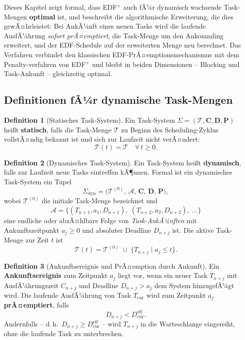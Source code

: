 ﻿\documentclass[a4paper,12pt]{article}
\theoremstyle{definition}
\newtheorem{definition}{Definition}
\begin{document}
	Dieses Kapitel zeigt formal, dass EDF$^+$ auch fÃ¼r dynamisch wachsende Task-Mengen
	\textbf{optimal} ist, und beschreibt die algorithmische Erweiterung, die dies
	gewÃ¤hrleistet: Bei AnkÃ¼nft eines neuen Tasks wird die laufende AusfÃ¼hrung
	\emph{sofort prÃ¤emptiert}, die Task-Menge um den Ankommling erweitert, und der
	EDF-Schedule auf der erweiterten Menge neu berechnet. Das Verfahren verbindet den
	klassischen EDF-PrÃ¤emptionsmechanismus mit dem Penalty-verfahren von EDF$^+$ und
	bleibt in beiden Dimensionen -- Blocking und Task-Ankunft -- gleichzeitig optimal.

	\subsection{Definitionen fÃ¼r dynamische Task-Mengen}

	\begin{definition}[Statisches Task-System]
		Ein Task-System $\Sigma = (\mathcal{T}, \mathbf{C}, \mathbf{D}, \mathbf{P})$
		hei\ss{}t \textbf{statisch}, falls die Task-Menge $\mathcal{T}$ zu Beginn des
		Scheduling-Zyklus vollstÃ¤ndig bekannt ist und sich zur Laufzeit nicht verÃ¤ndert:
		\[
		\mathcal{T}(t) = \mathcal{T} \quad \forall\, t \ge 0.
		\]
	\end{definition}

	\begin{definition}[Dynamisches Task-System]
		\label{def:dynamisch}
		Ein Task-System hei\ss{}t \textbf{dynamisch}, falls zur Laufzeit neue Tasks
		eintreffen kÃ¶nnen. Formal ist ein dynamisches Task-System ein Tupel
		\[
		\Sigma_{\mathrm{dyn}} = \bigl(\mathcal{T}^{(0)},\, \mathcal{A},\, \mathbf{C},\,
		\mathbf{D},\, \mathbf{P}\bigr),
		\]
		wobei $\mathcal{T}^{(0)}$ die initiale Task-Menge bezeichnet und
		\[
		\mathcal{A} = \bigl\{(T_{n+1}, a_1, D_{n+1}),\;(T_{n+2}, a_2, D_{n+2}),\;\ldots\bigr\}
		\]
		eine endliche oder abzÃ¤hlbare Folge von \emph{Task-AnkÃ¼nften} mit
		Ankunftszeitpunkt $a_j \ge 0$ und absoluter Deadline $D_{n+j}$ ist.
		Die aktive Task-Menge zur Zeit $t$ ist
		\[
		\mathcal{T}(t) = \mathcal{T}^{(0)} \;\cup\; \bigl\{T_{n+j} \mid a_j \le t\bigr\}.
		\]
	\end{definition}

	\begin{definition}[Ankunftsereignis und PrÃ¤emption durch Ankunft]
		\label{def:ankunft}
		Ein \textbf{Ankunftsereignis} zum Zeitpunkt $a_j$ liegt vor, wenn ein neuer
		Task $T_{n+j}$ mit AusfÃ¼hrungszeit $C_{n+j}$ und Deadline $D_{n+j} > a_j$
		dem System hinzugefÃ¼gt wird. Die laufende AusfÃ¼hrung von Task $T_{\mathrm{cur}}$
		wird zum Zeitpunkt $a_j$ \textbf{prÃ¤emptiert}, falls
		\[
		D_{n+j} < D_{\mathrm{cur}}^{\text{eff}}.
		\]
		Andernfalls -- d.\,h.\  $D_{n+j} \ge D_{\mathrm{cur}}^{\text{eff}}$ -- wird
		$T_{n+j}$ in die Warteschlange eingereiht, ohne die laufende Task zu unterbrechen.
	\end{definition}
\end{document}
